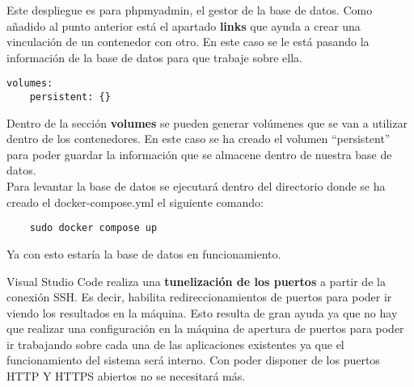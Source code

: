 Este despliegue es para phpmyadmin, el gestor de la base de datos. Como añadido al punto anterior está el apartado \textbf{links} que ayuda a crear una vinculación de un contenedor con otro. En este caso se le está pasando la información de la base de datos para que trabaje sobre ella.
\begin{verbatim}
volumes:
    persistent: {}
\end{verbatim}
Dentro de la sección \textbf{volumes} se pueden generar volúmenes que se van a utilizar dentro de los contenedores. En este caso se ha creado el volumen ``persistent'' para poder guardar la información que se almacene dentro de nuestra base de datos.
\vspace{\baselineskip}
\\Para levantar la base de datos se ejecutará dentro del directorio donde se ha creado el docker-compose.yml el siguiente comando:
\begin{verbatim}
    sudo docker compose up
\end{verbatim}
Ya con esto estaría la base de datos en funcionamiento.
\vspace{\baselineskip}
\begin{tcolorbox}
    [colback=green!5!white,colframe=green!75!black,fonttitle=\bfseries,title=¿Cómo comprobamos los resultados?]
    Visual Studio Code realiza una \textbf{tunelización de los puertos} a partir de la conexión SSH. Es decir, habilita redireccionamientos de puertos para poder ir viendo los resultados en la máquina. Esto resulta de gran ayuda ya que no hay que realizar una configuración en la máquina de apertura de puertos para poder ir trabajando sobre cada una de las aplicaciones existentes ya que el funcionamiento del sistema será interno. Con poder disponer de los puertos HTTP Y HTTPS abiertos no se necesitará más.
\end{tcolorbox}

